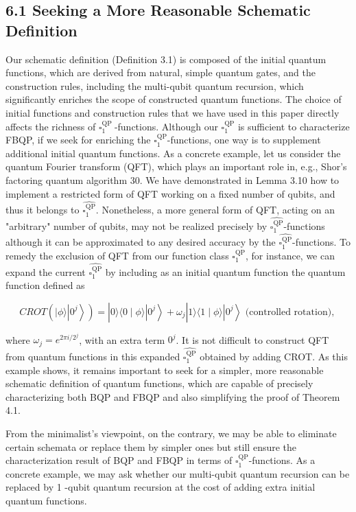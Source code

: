 \documentclass[10pt]{article}
\begin{document}
\subsection*{6.1 Seeking a More Reasonable Schematic Definition}
Our schematic definition (Definition 3.1) is composed of the initial quantum functions, which are derived from natural, simple quantum gates, and the construction rules, including the multi-qubit quantum recursion, which significantly enriches the scope of constructed quantum functions. The choice of initial functions and construction rules that we have used in this paper directly affects the richness of $\square_{1}^{\text {QP }}$-functions. Although our $\square_{1}^{\mathrm{QP}}$ is sufficient to characterize FBQP, if we seek for enriching the $\square_{1}^{\mathrm{QP}}$-functions, one way is to supplement additional initial quantum functions. As a concrete example, let us consider the quantum Fourier transform (QFT), which plays an important role in, e.g., Shor's factoring quantum algorithm 30. We have demonstrated in Lemma 3.10 how to implement a restricted form of QFT working on a fixed number of qubits, and thus it belongs to $\widehat{\square_{1}^{\mathrm{QP}}}$. Nonetheless, a more general form of QFT, acting on an "arbitrary" number of qubits, may not be realized precisely by $\widehat{\square_{1}^{\mathrm{QP}}}$-functions although it can be approximated to any desired accuracy by the $\widehat{\square_{1}^{\mathrm{QP}}}$-functions. To remedy the exclusion of QFT from our function class $\square_{1}^{\mathrm{QP}}$, for instance, we can expand the current $\widehat{\square_{1}^{\mathrm{QP}}}$ by including as an initial quantum function the quantum function defined as

$$
C R O T\left(|\phi\rangle\left|0^{j}\right\rangle\right)=|0\rangle\langle 0 \mid \phi\rangle\left|0^{j}\right\rangle+\omega_{j}|1\rangle\langle 1 \mid \phi\rangle\left|0^{j}\right\rangle \text { (controlled rotation), }
$$

where $\omega_{j}=e^{2 \pi i / 2^{j}}$, with an extra term $0^{j}$. It is not difficult to construct QFT from quantum functions in this expanded $\widehat{\square_{1}^{\mathrm{QP}}}$ obtained by adding CROT. As this example shows, it remains important to seek for a simpler, more reasonable schematic definition of quantum functions, which are capable of precisely characterizing both BQP and FBQP and also simplifying the proof of Theorem 4.1.

From the minimalist's viewpoint, on the contrary, we may be able to eliminate certain schemata or replace them by simpler ones but still ensure the characterization result of BQP and FBQP in terms of $\square_{1}^{\mathrm{QP}}$-functions. As a concrete example, we may ask whether our multi-qubit quantum recursion can be replaced by 1 -qubit quantum recursion at the cost of adding extra initial quantum functions.
\end{document}
